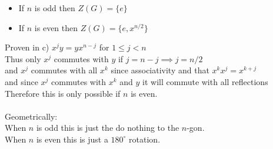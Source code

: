 \documentclass[12pt, letterpaper]{article}
\theoremstyle{definition}
\begin{document}
\begin{itemize}
    \item If $n$ is odd then $Z(G)=\{e\}$
    \item If $n$ is even then $Z(G)=\{e,x^{n/2}\}$
\end{itemize}
Proven in c) $x^jy=yx^{n-j}$ for $1 \leq j < n$\\
Thus only $x^j$ commutes with $y$ if $j=n-j \implies j=n/2$\\
and $x^j$ commutes with all $x^k$ since associativity and that $x^kx^j=x^{k+j}$\\
and since $x^j$ commutes with $x^k$ and $y$ it will commute with all reflections\\
Therefore this is only possible if $n$ is even.\\
\phantom{text}\\
Geometrically:\\
When $n$ is odd this is just the do nothing to the $n$-gon.\\
When $n$ is even this is just a $180^\circ$ rotation.

\newpage
\end{document}
